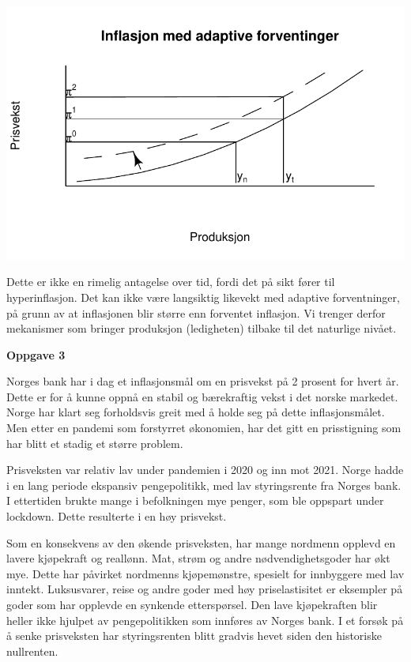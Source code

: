 \documentclass[
  letterpaper,
  DIV=11,
  numbers=noendperiod]{scrartcl}
\begin{document}
\includegraphics{31_SOK1016_M2_V23.pdf._files/figure-pdf/unnamed-chunk-2-1.pdf}

Dette er ikke en rimelig antagelse over tid, fordi det på sikt fører til
hyperinflasjon. Det kan ikke være langsiktig likevekt med adaptive
forventninger, på grunn av at inflasjonen blir større enn forventet
inflasjon. Vi trenger derfor mekanismer som bringer produksjon
(ledigheten) tilbake til det naturlige nivået.

\textbf{Oppgave 3}

Norges bank har i dag et inflasjonsmål om en prisvekst på 2 prosent for
hvert år. Dette er for å kunne oppnå en stabil og bærekraftig vekst i
det norske markedet. Norge har klart seg forholdsvis greit med å holde
seg på dette inflasjonsmålet. Men etter en pandemi som forstyrret
økonomien, har det gitt en prisstigning som har blitt et stadig et
større problem.

Prisveksten var relativ lav under pandemien i 2020 og inn mot 2021.
Norge hadde i en lang periode ekspansiv pengepolitikk, med lav
styringsrente fra Norges bank. I ettertiden brukte mange i befolkningen
mye penger, som ble oppspart under lockdown. Dette resulterte i en høy
prisvekst.

Som en konsekvens av den økende prisveksten, har mange nordmenn opplevd
en lavere kjøpekraft og reallønn. Mat, strøm og andre nødvendighetsgoder
har økt mye. Dette har påvirket nordmenns kjøpemønstre, spesielt for
innbyggere med lav inntekt. Luksusvarer, reise og andre goder med høy
priselastisitet er eksempler på goder som har opplevde en synkende
etterspørsel. Den lave kjøpekraften blir heller ikke hjulpet av
pengepolitikken som innføres av Norges bank. I et forsøk på å senke
prisveksten har styringsrenten blitt gradvis hevet siden den historiske
nullrenten.
\end{document}
